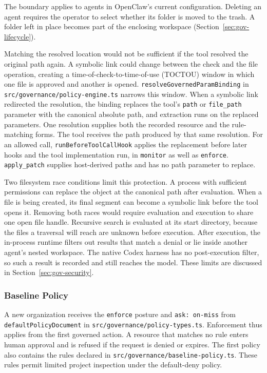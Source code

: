 {The boundary applies to agents in OpenClaw's current configuration. Deleting an
agent requires the operator to select whether its folder is moved to the trash. A folder left in place
becomes part of the enclosing workspace (Section~\ref{sec:gov-lifecycle}).

Matching the resolved location would not be sufficient if the tool resolved
the original path again. A symbolic link could change between the check and
the file operation, creating a time-of-check-to-time-of-use (TOCTOU) window in
which one file is approved and another is opened.
\texttt{resolveGovernedParamBinding} in \texttt{src/governance/\allowbreak policy-engine.ts}
narrows this window. When a symbolic link redirected the resolution, the
binding replaces the tool's \texttt{path} or \texttt{file\_path} parameter with
the canonical absolute path, and extraction runs on the replaced parameters.
One resolution supplies both the recorded resource and the rule-matching
forms. The tool receives the path produced by that same resolution. For an allowed call,
\texttt{runBeforeToolCallHook} applies the replacement before later hooks and
the tool implementation run, in \texttt{monitor} as well as \texttt{enforce}.
\texttt{apply\_patch} supplies host-derived paths and has no path parameter to
replace.

Two filesystem race conditions limit this protection. A process with sufficient permissions can
replace the object at the canonical path after evaluation. When a file is
being created, its final segment can become a symbolic link before the tool
opens it. Removing both races would require evaluation and execution to share
one open file handle. Recursive search is evaluated at its start directory,
because the files a traversal will reach are unknown before execution. After
execution, the in-process runtime filters out results that match a denial or lie
inside another agent's nested workspace. The native Codex harness has no
post-execution filter, so such a result is recorded and still reaches the
model. These limits are discussed in Section~\ref{sec:gov-security}.}


\subsubsection{Baseline Policy}

A new organization receives the \texttt{enforce} posture and
\texttt{ask: on-miss} from \break \texttt{defaultPolicyDocument} in
\texttt{src/governance/policy-types.ts}. Enforcement thus applies from
the first governed action. A resource that matches no rule enters human
approval and is refused if the request is denied or expires. The first policy
also contains the rules declared in
\texttt{src/governance/baseline-policy.ts}. These rules permit limited project
inspection under the default-deny policy.

